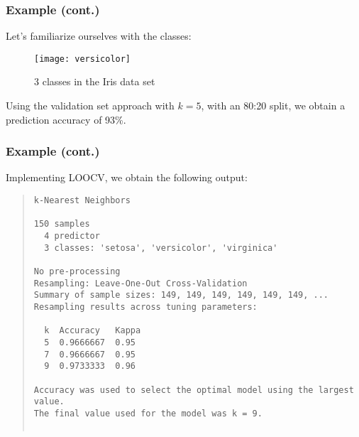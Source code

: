 \documentclass[smaller]{beamer}
\newcommand{\?}{\stackrel{?}{=}}
\newcommand{\bl}{\color{blue}}
\begin{document}
\begin{frame}
  \frametitle{Example (cont.)}\pause
  Let's familiarize ourselves with the classes:\pause
  \begin{figure}[h!]
    \centering
    \texttt{[image: versicolor]}
    \caption{3 classes in the Iris data set}
    \label{fig:class}
  \end{figure}
  \pause
  Using the validation set approach with $k=5$, with an 80:20 split, we obtain a prediction accuracy of 93\%.
\end{frame}

\begin{frame}[fragile]
  \frametitle{Example (cont.)}
  \pause
  Implementing LOOCV, we obtain the following output: \pause
  
  \begin{quote}\footnotesize\bl
\begin{verbatim}
k-Nearest Neighbors 

150 samples
  4 predictor
  3 classes: 'setosa', 'versicolor', 'virginica' 

No pre-processing
Resampling: Leave-One-Out Cross-Validation 
Summary of sample sizes: 149, 149, 149, 149, 149, 149, ... 
Resampling results across tuning parameters:

  k  Accuracy   Kappa
  5  0.9666667  0.95 
  7  0.9666667  0.95 
  9  0.9733333  0.96 

Accuracy was used to select the optimal model using the largest value.
The final value used for the model was k = 9.


\end{verbatim}
  \end{quote}
\end{frame}
\end{document}
